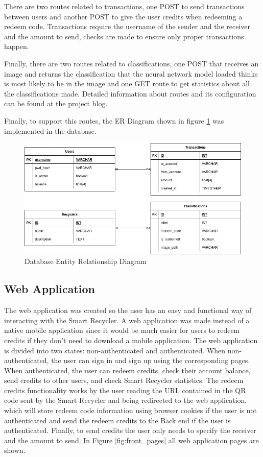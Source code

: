 \documentclass[a4paper,11pt]{article}
\begin{document}
There are two routes related to transactions, one POST to send transactions between users and another POST to give the user credits when redeeming a redeem code. Transactions require the username of the sender and the receiver and the amount to send, checks are made to ensure only proper transactions happen.

Finally, there are two routes related to classifications, one POST that receives an image and returns the classification that the neural network model loaded thinks is most likely to be in the image and one GET route to get statistics about all the classifications made. Detailed information about routes and its configuration can be found at the project blog\cite{blog}.

Finally, to support this routes, the ER Diagram shown in figure \ref{fig:er_diagram} was implemented in the database.

\begin{figure}[H]
  \centering
  \includegraphics[width=12.5cm]{Figures/ERDiagram.png}
  \caption{\small{Database Entity Relationship Diagram}}
  \label{fig:er_diagram}
\end{figure}

\subsection{Web Application}
\label{subsec:webapp}
The web application was created so the user has an easy and functional way of interacting with the Smart Recycler. A web application was made instead of a native mobile application since it would be much easier for users to redeem credits if they don’t need to download a mobile application.
The web application is divided into two states: non-authenticated and authenticated. When non-authenticated, the user can sign in and sign up using the corresponding pages. When authenticated, the user can redeem credits, check their account balance, send credits to other users, and check Smart Recycler statistics. The redeem credits functionality works by the user reading the URL contained in the QR code sent by the Smart Recycler and being redirected to the web application, which will store redeem code information using browser cookies if the user is not authenticated and send the redeem credits to the Back end if the user is authenticated. Finally, to send credits the user only needs to specify the receiver and the amount to send.
In Figure \ref{fig:front_pages} all web application pages are shown.
\end{document}
